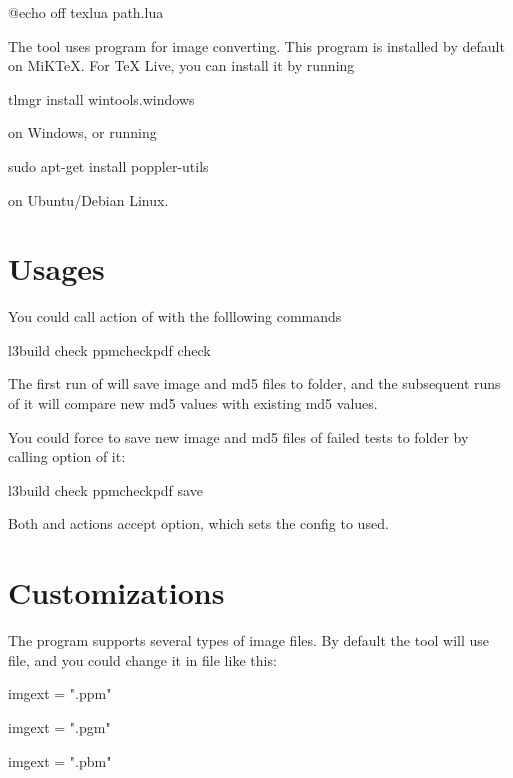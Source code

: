 \documentclass[oneside,12pt]{article}
\begin{document}
\begin{codehigh}
@echo off
texlua path\to\ppmcheckpdf.lua %
\end{codehigh}

The  tool uses  program for image converting.
This program is installed by default on MiKTeX. For TeX Live, you can install it by running
\begin{codehigh}
tlmgr install wintools.windows
\end{codehigh}
on Windows, or running
\begin{codehigh}
sudo apt-get install poppler-utils
\end{codehigh}
on Ubuntu/Debian Linux.

\section{Usages}

You could call  action of  with the folllowing commands
\begin{codehigh}
l3build check
ppmcheckpdf check
\end{codehigh}

The first run of  will save image and md5 files to  folder,
and the subsequent runs of it will compare new md5 values with existing md5 values.

You could force  to save new image and md5 files of failed tests to
 folder by calling  option of it:
\begin{codehigh}
l3build check
ppmcheckpdf save
\end{codehigh}

Both  and  actions accept  option, which sets the config to used.

\section{Customizations}

The  program supports several types of image files.
By default the  tool will use  file,
and you could change it in  file like this:
\begin{codehigh}
imgext = ".ppm"
\end{codehigh}
\begin{codehigh}
imgext = ".pgm"
\end{codehigh}
\begin{codehigh}
imgext = ".pbm"
\end{codehigh}
\end{document}
